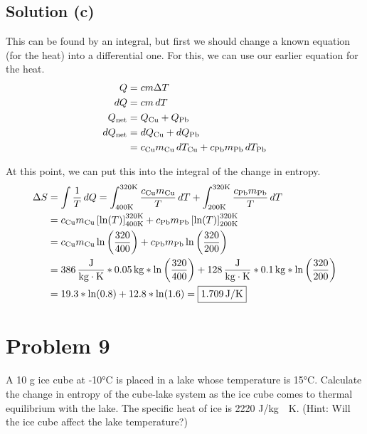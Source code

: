 \documentclass[12pt]{article}
\begin{document}
        \subsection{Solution (c)}
            This can be found by an integral, but first we should change a known equation (for the heat) into a differential one.
            For this, we can use our earlier equation for the heat. 
            \begin{align}
                Q   &=  cm\Delta T\\
                dQ  &=  cm\,dT\\
                Q_{\rm net} &=  Q_{\rm Cu} + Q_{\rm Pb}\\
                dQ_{\rm net}    &=  dQ_{\rm Cu} + dQ_{\rm Pb}\\
                    &=  c_{\rm Cu} m_{\rm Cu} \, dT_{\rm Cu} + c_{\rm Pb} m_{\rm Pb} \, dT_{\rm Pb}
            \end{align}

            At this point, we can put this into the integral of the change in entropy.
            \begin{align}
                \Delta S    &=  \int \frac{1}{T}\,dQ
                    =   \int_{400\unit{\kelvin}}^{320\unit{\kelvin}} \frac{c_{\rm Cu} m_{\rm Cu}}{T} \,dT + \int_{200\unit{\kelvin}}^{320\unit{\kelvin}} \frac{c_{\rm Pb} m_{\rm Pb}}{T} \,dT\\
                    &=  c_{\rm Cu} m_{\rm Cu} \left[ \ln(T) \right]_{400\unit{\kelvin}}^{320\unit{\kelvin}} + c_{\rm Pb} m_{\rm Pb} \left[ \ln(T) \right]_{200\unit{\kelvin}}^{320\unit{\kelvin}}\\
                    &=  c_{\rm Cu} m_{\rm Cu} \ln\left( \frac{320}{400} \right) + c_{\rm Pb} m_{\rm Pb} \ln\left( \frac{320}{200} \right)\\
                    &=  386\,\unit{\frac{\joule}{\kilo\gram\cdot\kelvin}} * 0.05\,\unit{\kilo\gram} * \ln\left( \frac{320}{400} \right) + 128\,\unit{\frac{\joule}{\kilo\gram\cdot\kelvin}} * 0.1\,\unit{\kilo\gram} * \ln\left( \frac{320}{200} \right)\\
                    &=  19.3 * \ln(0.8) + 12.8 * \ln(1.6)
                    =   \boxed{1.709\,\unit{\joule/\kelvin}}
            \end{align}

    \pagebreak
    \section{Problem 9}
        A 10 g ice cube at -10\unit{\celsius} is placed in a lake whose temperature is 15°C. 
        Calculate the change in entropy of the cube-lake system as the ice cube comes to thermal equilibrium with the lake. 
        The specific heat of ice is 2220 \unit{\joule/\kilo\gram\cdot\kelvin}. 
        (Hint: Will the ice cube affect the lake temperature?)
\end{document}
